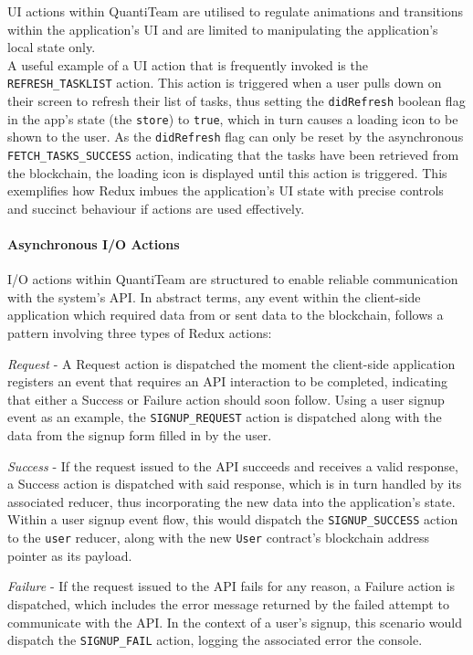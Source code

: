 UI actions within QuantiTeam are utilised to regulate animations and
transitions within the application's UI and are limited to manipulating
the application's local state only.\\
A useful example of a UI action that is frequently invoked is the
\texttt{REFRESH\_TASKLIST} action. This action is triggered when a user
pulls down on their screen to refresh their list of tasks, thus setting
the \texttt{didRefresh} boolean flag in the app's state (the
\texttt{store}) to \texttt{true}, which in turn causes a loading icon to
be shown to the user. As the \texttt{didRefresh} flag can only be reset
by the asynchronous \texttt{FETCH\_TASKS\_SUCCESS} action, indicating
that the tasks have been retrieved from the blockchain, the loading icon
is displayed until this action is triggered. This exemplifies how Redux
imbues the application's UI state with precise controls and succinct
behaviour if actions are used effectively.

\paragraph{Asynchronous I/O Actions}\label{asynchronous-io-actions}

I/O actions within QuantiTeam are structured to enable reliable
communication with the system's API. In abstract terms, any event within
the client-side application which required data from or sent data to the
blockchain, follows a pattern involving three types of Redux
actions\cite{1redux}:

\emph{Request} - A Request action is dispatched the moment the
client-side application registers an event that requires an API
interaction to be completed, indicating that either a Success or Failure
action should soon follow. Using a user signup event as an example, the
\texttt{SIGNUP\_REQUEST} action is dispatched along with the data from
the signup form filled in by the user.

\emph{Success} - If the request issued to the API succeeds and receives
a valid response, a Success action is dispatched with said response,
which is in turn handled by its associated reducer, thus incorporating
the new data into the application's state. Within a user signup event
flow, this would dispatch the \texttt{SIGNUP\_SUCCESS} action to the
\texttt{user} reducer, along with the new \texttt{User} contract's
blockchain address pointer as its payload.

\emph{Failure} - If the request issued to the API fails for any reason,
a Failure action is dispatched, which includes the error message
returned by the failed attempt to communicate with the API. In the
context of a user's signup, this scenario would dispatch the
\texttt{SIGNUP\_FAIL} action, logging the associated error the console.

